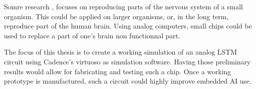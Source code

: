 Somre research \cite{celegans}, focuses on reproducing parts of the nervous system of a small organism. This could be applied on larger organisms, or, in the long term, reproduce part of the human brain. Using analog computers, small chips could be used to replace a part of one's brain non functionnal part.

The focus of this thesis is to create a working simulation of an analog \ac{LSTM} circuit using Cadence's virtuoso as simulation software. Having those preliminary results would allow for fabricating and testing such a chip. Once a working prototype is manufactured, such a circuit could highly improve embedded \ac{AI} use.
